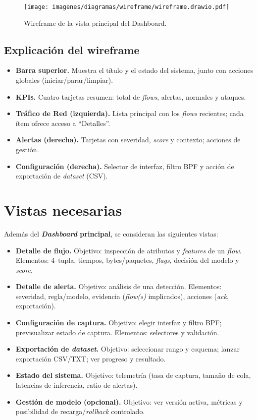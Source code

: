 \begin{figure}[H]
    \centering
    \texttt{[image: imagenes/diagramas/wireframe/wireframe.drawio.pdf]}
    \caption{Wireframe de la vista principal del Dashboard.}
    \label{fig:wireframe-dashboard}
\end{figure}

\subsection*{Explicación del wireframe}
\begin{itemize}
  \item \textbf{Barra superior.} Muestra el título y el estado del sistema, junto con acciones globales (iniciar/parar/limpiar).
  \item \textbf{KPIs.} Cuatro tarjetas resumen: total de \emph{flows}, alertas, normales y ataques.
  \item \textbf{Tráfico de Red (izquierda).} Lista principal con los \emph{flows} recientes; cada ítem ofrece acceso a ``Detalles''.
  \item \textbf{Alertas (derecha).} Tarjetas con severidad, \textit{score} y contexto; acciones de gestión.
  \item \textbf{Configuración (derecha).} Selector de interfaz, filtro BPF y acción de exportación de \textit{dataset} (CSV).
\end{itemize}

\section{Vistas necesarias}
Además del \textbf{\textit{Dashboard} principal}, se consideran las siguientes vistas:
\begin{itemize}
  \item \textbf{Detalle de flujo.} Objetivo: inspección de atributos y \emph{features} de un \emph{flow}. Elementos: 4--tupla, tiempos, bytes/paquetes, \textit{flags}, decisión del modelo y \emph{score}.
  \item \textbf{Detalle de alerta.} Objetivo: análisis de una detección. Elementos: severidad, regla/modelo, evidencia (\textit{flow(s)} implicados), acciones (\textit{ack}, exportación).
  \item \textbf{Configuración de captura.} Objetivo: elegir interfaz y filtro BPF; previsualizar estado de captura. Elementos: selectores y validación.
  \item \textbf{Exportación de \textit{dataset}.} Objetivo: seleccionar rango y esquema; lanzar exportación CSV/TXT; ver progreso y resultado.
  \item \textbf{Estado del sistema.} Objetivo: telemetría (tasa de captura, tamaño de cola, latencias de inferencia, ratio de alertas).
  \item \textbf{Gestión de modelo (opcional).} Objetivo: ver versión activa, métricas y posibilidad de recarga/\textit{rollback} controlado.
\end{itemize}

